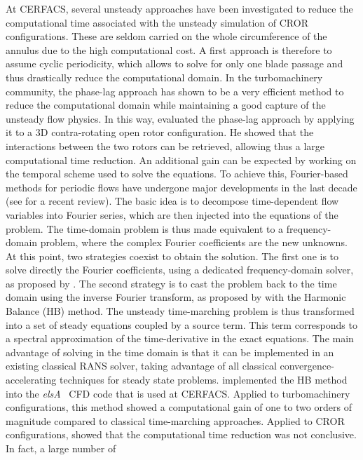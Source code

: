 At CERFACS, several unsteady approaches have been investigated 
to reduce the computational time associated with the unsteady simulation of 
CROR configurations. 
These are seldom carried on the whole
circumference of the annulus due to the high computational
cost. A first approach is therefore to assume cyclic periodicity,
which allows to solve for only one blade passage and thus drastically
reduce the computational domain. 
In the turbomachinery community, the phase-lag approach has shown to be
a very efficient method to reduce the computational domain while
maintaining a good capture of the unsteady flow physics. 
In this way, \citet{Burnazzi2010} evaluated the phase-lag approach
by applying it
to a 3D contra-rotating open rotor configuration. He showed
that the interactions between the two rotors can be retrieved, allowing
thus a large computational time reduction.
An additional gain can be expected by working on
the temporal scheme used to solve the equations. 
To achieve
this, Fourier-based methods for periodic flows have undergone major
developments in the last decade (see \citet{He2010} for a recent
review).  The basic idea is to decompose
time-dependent flow variables into Fourier series, which are then
injected into the equations of the problem. The time-domain problem is
thus made equivalent to a frequency-domain problem, where the complex
Fourier coefficients are the new unknowns. At this point, two
strategies coexist to obtain the solution. The first one is to solve
directly the Fourier coefficients, using a dedicated
frequency-domain solver, as proposed by \citet{He1998}. The second strategy is to cast the
problem back to the time domain using the inverse Fourier transform, as
proposed by \citet{Hall2002} with the Harmonic
Balance (HB) method. The unsteady time-marching problem is thus
transformed into a set of steady equations coupled by a source term.
This term corresponds to a spectral approximation of the 
time-derivative in the exact equations. The main advantage of solving in the time domain is
that it can be implemented in an existing classical RANS solver,
taking advantage of all classical convergence-accelerating techniques
for steady state problems.
\citet{ThesisSicot} implemented
the HB method into the \textit{elsA}~\cite{Cambier2013} CFD code
that is used at CERFACS. Applied to turbomachinery
configurations, this method showed a computational gain
of one to two orders of magnitude 
compared to classical time-marching approaches.
Applied to CROR configurations, \citet{Yabili2010}
showed that the computational time reduction
was not conclusive. In fact, a large number of 
